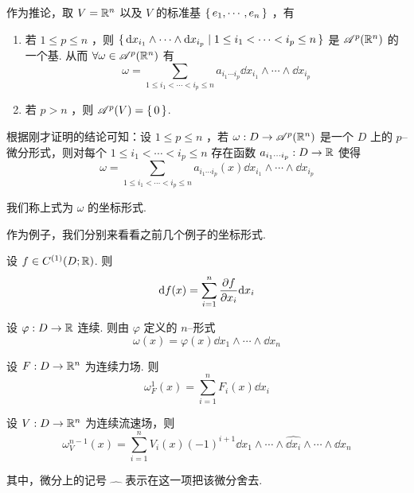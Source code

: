 作为推论，取 $V=\mathbb{R}^n$ 以及 $V$ 的标准基 $\set{e_1,\cdots,e_n}$ ，有

\begin{inference}
    \begin{enumerate}
        \item 若 $1\le p\le n$ ，则 $\set{\mathrm{d}x_{i_1}\wedge\cdots\wedge\mathrm{d}x_{i_p}|1\le i_1<\cdots<i_p\le n}$ 是 $\mathscr{A}^p(\mathbb{R}^n)$ 的一个基. 从而 $\forall\omega\in\mathscr{A}^p(\mathbb{R}^n)$ 有
$$
\omega=\sum_{1\le i_1<\cdots<i_p\le n}a_{i_1\cdots i_p}\dd x_{i_1}\wedge\cdots\wedge\dd x_{i_p}
$$

        \item 若 $p>n$ ，则 $\mathscr{A}^p(V)=\set{0}$.
    \end{enumerate}
\end{inference}


根据刚才证明的结论可知：设 $1\le p\le n$ ，若 $\omega:D\to\mathscr{A}^p(\mathbb{R}^n)$ 是一个 $D$ 上的 $p$--微分形式，则对每个 $1\le i_1<\cdots<i_p\le n$ 存在函数 $a_{i_1\cdots i_p}:D\to\mathbb{R}$ 使得
$$
\omega=\sum_{1\le i_1<\cdots<i_p\le n}a_{i_1\cdots i_p}(x)\dd x_{i_1}\wedge\cdots\wedge\dd x_{i_p}
$$

我们称上式为 $\omega$ 的坐标形式.

作为例子，我们分别来看看之前几个例子的坐标形式.

\begin{example}[']
    设 $f\in C^{(1)}(D;\mathbb{R})$. 则
$$
\mathrm{d} f(x)=\sum_{i=1}^n\frac{\partial{f}}{\partial{x_i}}\mathrm{d} x_i
$$
\end{example}

\begin{example}[']
    设 $\varphi:D\to\mathbb{R}$ 连续. 则由 $\varphi$ 定义的 $n$--形式
$$
\omega(x)=\varphi(x)\dd x_1\wedge\cdots\wedge\dd x_n
$$
\end{example}

\begin{example}[']
    设 $F:D\to\mathbb{R}^n$ 为连续力场. 则
$$
\omega_F^1(x)=\sum_{i=1}^nF_i(x)\dd x_i
$$
\end{example}

\begin{example}[']
    设 $V:D\to\mathbb{R}^n$ 为连续流速场，则
$$
\omega_V^{n-1}(x)=\sum_{i=1}^nV_i(x)(-1)^{i+1}\dd x_1\wedge\cdots\wedge\widehat{\dd x_i}\wedge\cdots\wedge\dd x_n
$$

    其中，微分上的记号 $\widehat{\quad}$ 表示在这一项把该微分舍去.
\end{example}

